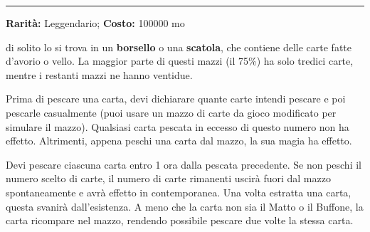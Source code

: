 \begin{multicols}{2}
\smallskip\noindent\rule{\linewidth}{2pt}  \hypertarget{MazzodelleMeraviglie}{}\smallskip{}\noindent\label{MazzodelleMeraviglie}

\textbf{Rarità:} Leggendario; \textbf{Costo:} 100000 mo

di solito lo si trova in un \textbf{borsello} o una \textbf{scatola}, che contiene delle carte fatte d'avorio o vello. La maggior parte di questi mazzi (il 75\%) ha solo tredici carte, mentre i restanti mazzi ne hanno ventidue.

Prima di pescare una carta, devi dichiarare quante carte intendi pescare e poi pescarle casualmente (puoi usare un mazzo di carte da gioco modificato per simulare il mazzo). Qualsiasi carta pescata in eccesso di questo numero non ha effetto. Altrimenti, appena peschi una carta dal mazzo, la sua magia ha effetto.

Devi pescare ciascuna carta entro 1 ora dalla pescata precedente. Se non peschi il numero scelto di carte, il numero di carte rimanenti uscirà fuori dal mazzo spontaneamente e avrà effetto in contemporanea. Una volta estratta una carta, questa svanirà dall'esistenza. A meno che la carta non sia il Matto o il Buffone, la carta ricompare nel mazzo, rendendo possibile pescare due volte la stessa carta.

\medskip


\end{multicols}
